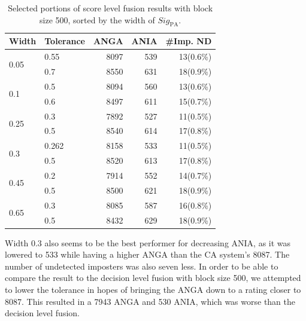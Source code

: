 \begin{table}[htbp]
\centering
\begin{tabular}{llrrr}
\hline
\textbf{Width}        & \textbf{Tolerance} & \textbf{ANGA} & \textbf{ANIA} & \textbf{\#Imp. ND} \\ \hline
\multirow{2}{*}{0.05} & 0.55               & 8097          & 539           & 13(0.6\%)          \\
                      & 0.7                & 8550          & 631           & 18(0.9\%)          \\ \hline
\multirow{2}{*}{0.1}  & 0.5                & 8094          & 560           & 13(0.6\%)          \\
                      & 0.6                & 8497          & 611           & 15(0.7\%)          \\ \hline
\multirow{2}{*}{0.25} & 0.3                & 7892          & 527           & 11(0.5\%)          \\
                      & 0.5                & 8540          & 614           & 17(0.8\%)          \\ \hline
\multirow{2}{*}{0.3}  & 0.262               & 8158          & 533          & 11(0.5\%)          \\
                      & 0.5                & 8520          & 613           & 17(0.8\%)          \\ \hline
\multirow{2}{*}{0.45} & 0.2                & 7914          & 552           & 14(0.7\%)          \\
                      & 0.5                & 8500          & 621           & 18(0.9\%)          \\ \hline
\multirow{2}{*}{0.65} & 0.3                & 8085          & 587           & 16(0.8\%)          \\
                      & 0.5                & 8432          & 629           & 18(0.9\%)          \\ \hline
\end{tabular}
\caption{Selected portions of score level fusion results with block size 500, sorted by the width of $\textit{Sig}_{\text{PA}}$.}
\label{tab:analysis-score-level-BL500}
\end{table}

Width 0.3 also seems to be the best performer for decreasing ANIA, as it was lowered to 533 while having a higher ANGA than the CA system's 8087.
The number of undetected imposters was also seven less.
In order to be able to compare the result to the decision level fusion with block size 500, we attempted to lower the tolerance in hopes of bringing the ANGA down to a rating closer to 8087.
This resulted in a 7943 ANGA and 530 ANIA, which was worse than the decision level fusion.

